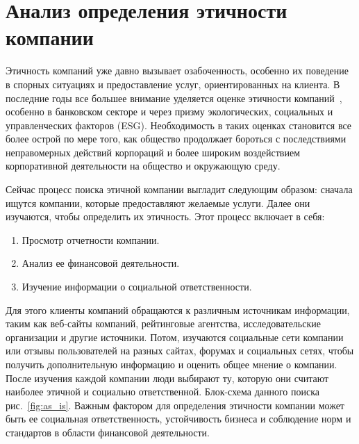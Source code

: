 \documentclass{article}
\begin{document}
\section{Анализ определения этичности компании}
\label{sec:org7362914}
Этичность компаний уже давно вызывает озабоченность, особенно их поведение в спорных ситуациях и предоставление услуг, ориентированных на клиента. В последние годы все большее внимание уделяется оценке этичности компаний~\autocites{mure_esg_2021}[][]{semenko_korporativnaya_2022}[][]{kudryavceva_korporativnosocialnaya_2016}, особенно в банковском секторе и через призму экологических, социальных и управленческих факторов (ESG). Необходимость в таких оценках становится все более острой по мере того, как общество продолжает бороться с последствиями неправомерных действий корпораций и более широким воздействием корпоративной деятельности на общество и окружающую среду.

Сейчас процесс поиска этичной компании выгладит следующим образом: сначала ищутся компании, которые предоставляют желаемые услуги. Далее они изучаются, чтобы определить их этичность. Этот процесс включает в себя:
\begin{enumerate}
\item Просмотр отчетности компании.
\item Анализ ее финансовой деятельности.
\item Изучение информации о социальной ответственности.
\end{enumerate}

Для этого клиенты компаний обращаются к различным источникам информации, таким как веб-сайты компаний, рейтинговые агентства, исследовательские организации и другие источники. Потом, изучаются социальные сети компании или отзывы пользователей на разных сайтах, форумах и социальных сетях, чтобы получить дополнительную информацию и оценить общее мнение о компании. После изучения каждой компании люди выбирают ту, которую они считают наиболее этичной и социально ответственной. Блок-схема данного поиска рис.~\ref{fig:as_is}. Важным фактором для определения этичности компании может быть ее социальная ответственность, устойчивость бизнеса и соблюдение норм и стандартов в области финансовой деятельности.
\end{document}
